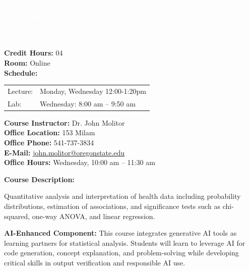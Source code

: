 \documentclass[11pt]{article}
\title{}
\author{}
\date{}
\begin{document}
\begin{tcolorbox}[colback=osaorange,colframe=black,boxrule=2pt,arc=0pt,left=6pt,right=6pt,top=10pt,bottom=10pt]
\centering
\textcolor{white}{\textbf{\large Oregon State University}}\\
\textcolor{white}{\textbf{\large College of Health}}\\
\textcolor{white}{\textbf{\large H524 Introduction to Biostatistics}}\\
\textcolor{white}{\textbf{\large Fall 2025}}
\end{tcolorbox}

\vspace{8pt}

\noindent\textbf{Credit Hours:} 04\\
\textbf{Room:} Online\\
\textbf{Schedule:}

\vspace{4pt}

\begin{tabular}{@{}ll@{}}
Lecture: & Monday, Wednesday 12:00-1:20pm\\
Lab: & Wednesday: 8:00 am -- 9:50 am
\end{tabular}

\vspace{8pt}

\noindent\textbf{Course Instructor:} Dr. John Molitor\\
\textbf{Office Location:} 153 Milam\\
\textbf{Office Phone:} 541-737-3834\\
\textbf{E-Mail:} \href{mailto:john.molitor@oregonstate.edu}{john.molitor@oregonstate.edu}\\
\textbf{Office Hours:} Wednesday, 10:00 am -- 11:30 am

\vspace{8pt}

\noindent\textbf{Course Description:}

Quantitative analysis and interpretation of health data including probability distributions, estimation of associations, and significance tests such as chi-squared, one-way ANOVA, and linear regression.

\textbf{\textcolor{aiblue}{AI-Enhanced Component:}} This course integrates generative AI tools as learning partners for statistical analysis. Students will learn to leverage AI for code generation, concept explanation, and problem-solving while developing critical skills in output verification and responsible AI use.
\end{document}
